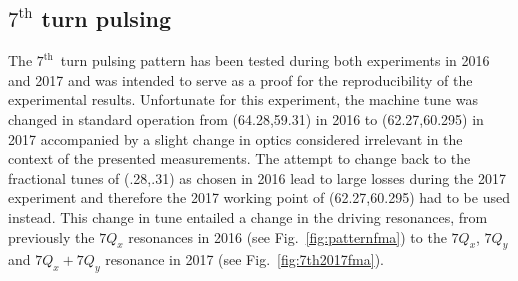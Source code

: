 \documentclass[%
 reprint,
 amsmath,amssymb,
 aps,
prstab,
]{revtex4-1}
\begin{document}
\subsection{$7^{\mathrm{th}}$ turn pulsing\label{sec:simex7}}
The $7^{\mathrm{th}}$~turn pulsing pattern has been tested during both experiments in 2016 and 2017 and was intended to serve as a proof for the reproducibility of the experimental results. Unfortunate for this experiment, the machine tune was changed in standard operation from (64.28,59.31) in 2016 to (62.27,60.295) in 2017 accompanied by a slight change in optics considered irrelevant in the context of the presented measurements. The attempt to change back to the fractional tunes of (.28,.31) as chosen in 2016 lead to large losses during the 2017 experiment and therefore the 2017 working point of (62.27,60.295) had to be used instead. This change in tune entailed a change in the driving resonances, from previously the $7Q_x$ resonances in 2016 (see Fig.~\ref{fig:patternfma}) to the $7Q_x$, $7Q_y$ and $7Q_x + 7Q_y$ resonance in 2017 (see Fig.~\ref{fig:7th2017fma}).
\end{document}
